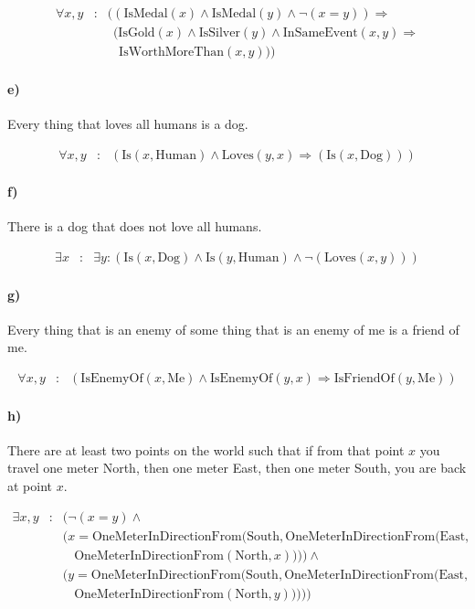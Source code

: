 \documentclass[12pt,letterpaper]{article}
\newcommand\myand{\wedge}
\newcommand\mynot{\neg}
\renewcommand\implies{\Rightarrow}
\begin{document}
\begin{eqnarray*}
\forall x, y &:& ((\text{IsMedal}(x) \myand \text{IsMedal}(y) \myand \mynot(x=y)) \implies \\
&& ~~(\text{IsGold}(x) \myand \text{IsSilver}(y) \myand \text{InSameEvent}(x, y) \implies \\
&& ~~~~\text{IsWorthMoreThan}(x, y))
)
\end{eqnarray*}

\paragraph{e)} Every thing that loves all humans is a dog.

\begin{eqnarray*}
\forall x, y &:& (\text{Is}(x, \text{Human}) \myand \text{Loves}(y, x) \implies (\text{Is}(x, \text{Dog})))
\end{eqnarray*}

\paragraph{f)} There is a dog that does not love all humans.

\begin{eqnarray*}
\exists x &:& \exists y : (\text{Is}(x, \text{Dog}) \myand \text{Is}(y, \text{Human}) \myand \mynot(\text{Loves}(x, y)))
\end{eqnarray*}

\paragraph{g)} Every thing that is an enemy of some thing that is an enemy of me is a friend of me.

\begin{eqnarray*}
\forall x, y &:& (\text{IsEnemyOf}(x, \text{Me}) \myand \text{IsEnemyOf}(y, x) \implies \text{IsFriendOf}(y, \text{Me}))
\end{eqnarray*}

\paragraph{h)} There are at least two points on the world such that if from that point $x$ you travel one meter North, then one meter East, then one meter South, you are back at point $x$.

\begin{eqnarray*}
\exists x, y &:& (\mynot(x=y) \myand \\
&& (x=\text{OneMeterInDirectionFrom}(\text{South}, \text{OneMeterInDirectionFrom}(\text{East}, \\
&& ~~~~\text{OneMeterInDirectionFrom}(\text{North}, x)))) \myand \\
&& (y=\text{OneMeterInDirectionFrom}(\text{South}, \text{OneMeterInDirectionFrom}(\text{East}, \\
&& ~~~~\text{OneMeterInDirectionFrom}(\text{North}, y)))))
\end{eqnarray*}
\end{document}
